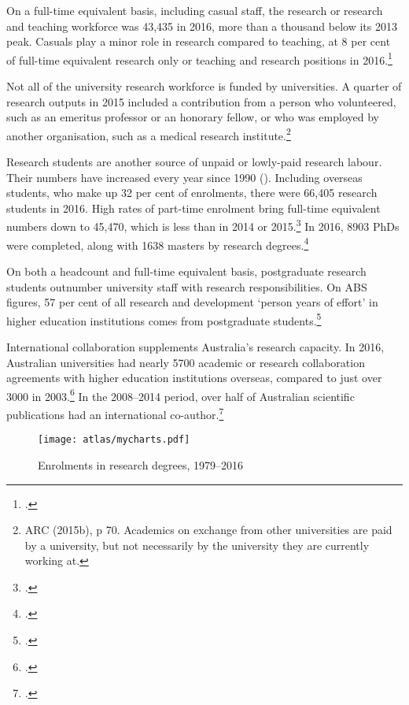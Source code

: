 \documentclass{grattan}
\begin{document}
On a full-time equivalent basis, including casual staff, the research or research and teaching workforce was 43,435 in 2016, more than a thousand below its 2013 peak. Casuals play a minor role in research compared to teaching, at 8 per cent of full-time equivalent research only or teaching and research positions in 2016.\footcite[][]{DepartmentofEducationandTraining2018ucubehighereduc}

Not all of the university research workforce is funded by universities. A quarter of research outputs in 2015 included a contribution from a person who volunteered, such as an emeritus professor or an honorary fellow, or who was employed by another organisation, such as a medical research institute.\footnote{ARC (2015b), p 70. Academics on exchange from other universities are paid by a university, but not necessarily by the university they are currently working at.}

Research students are another source of unpaid or lowly-paid research labour. Their numbers have increased every year since 1990 (). Including overseas students, who make up 32 per cent of enrolments, there were 66,405 research students in 2016. High rates of part-time enrolment bring full-time equivalent numbers down to 45,470, which is less than in 2014 or 2015.\footcite[][]{DepartmentofEducationandTraining2018ucubehighereduc} In 2016, 8903 PhDs were completed, along with 1638 masters by research degrees.\footcite[][]{DepartmentofEducationandTraining2017totalresourcingfo}

On both a headcount and full-time equivalent basis, postgraduate research students outnumber university staff with research responsibilities. On ABS figures, 57 per cent of all research and development `person years of effort' in higher education institutions comes from postgraduate students.\footcite[][]{ABS2018researchandexperi}

International collaboration supplements Australia's research capacity. In 2016, Australian universities had nearly 5700 academic or research collaboration agreements with higher education institutions overseas, compared to just over 3000 in 2003.\footcite[][5]{UniversitiesAustralia2016internationallinks} In the 2008--2014 period, over half of Australian scientific publications had an international co-author.\footcite[][790]{UNESCO2016unescosciencerepo}


    \begin{figure} %
    \caption{Enrolments in research degrees, 1979--2016}\label{fig:enrolments-in-research-degrees-19792016}
    \texttt{[image: atlas/mycharts.pdf]}
    \end{figure}
\end{document}
